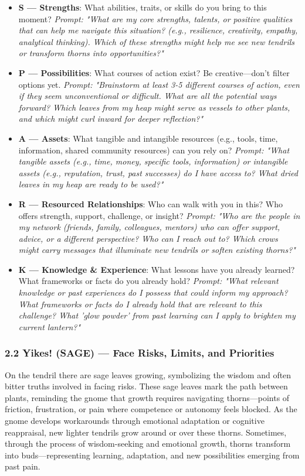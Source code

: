 \documentclass{article}
\begin{document}
\begin{itemize}[noitemsep,topsep=0pt]
    \item \textbf{S — Strengths}: What abilities, traits, or skills do you bring to this moment? \textit{Prompt: "What are my core strengths, talents, or positive qualities that can help me navigate this situation? (e.g., resilience, creativity, empathy, analytical thinking). Which of these strengths might help me see new tendrils or transform thorns into opportunities?"}
    \item \textbf{P — Possibilities}: What courses of action exist? Be creative—don't filter options yet. \textit{Prompt: "Brainstorm at least 3-5 different courses of action, even if they seem unconventional or difficult. What are all the potential ways forward? Which leaves from my heap might serve as vessels to other plants, and which might curl inward for deeper reflection?"}
    \item \textbf{A — Assets}: What tangible and intangible resources (e.g., tools, time, information, shared community resources) can you rely on? \textit{Prompt: "What tangible assets (e.g., time, money, specific tools, information) or intangible assets (e.g., reputation, trust, past successes) do I have access to? What dried leaves in my heap are ready to be used?"}
    \item \textbf{R — Resourced Relationships}: Who can walk with you in this? Who offers strength, support, challenge, or insight? \textit{Prompt: "Who are the people in my network (friends, family, colleagues, mentors) who can offer support, advice, or a different perspective? Who can I reach out to? Which crows might carry messages that illuminate new tendrils or soften existing thorns?"}
    \item \textbf{K — Knowledge \& Experience}: What lessons have you already learned? What frameworks or facts do you already hold? \textit{Prompt: "What relevant knowledge or past experiences do I possess that could inform my approach? What frameworks or facts do I already hold that are relevant to this challenge? What 'glow powder' from past learning can I apply to brighten my current lantern?"}
\end{itemize}

\subsubsection{2.2 Yikes! (SAGE) — Face Risks, Limits, and Priorities}
On the tendril there are sage leaves growing, symbolizing the wisdom and often bitter truths involved in facing risks. These sage leaves mark the path between plants, reminding the gnome that growth requires navigating thorns—points of friction, frustration, or pain where competence or autonomy feels blocked. As the gnome develops workarounds through emotional adaptation or cognitive reappraisal, new lighter tendrils grow around or over these thorns. Sometimes, through the process of wisdom-seeking and emotional growth, thorns transform into buds—representing learning, adaptation, and new possibilities emerging from past pain.
\end{document}

